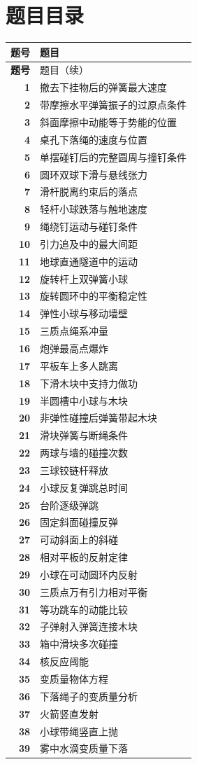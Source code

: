 \documentclass[UTF8,fontset=fandol,a4paper,11pt]{ctexart}
\begin{document}
\section*{题目目录}
\begin{longtable}{@{}>{\color{accent}\bfseries}r p{120mm}@{}}
\toprule 题号 & 题目\\\midrule
\endfirsthead
\toprule 题号 & 题目（续）\\\midrule
\endhead
1 & 撤去下挂物后的弹簧最大速度 \\
2 & 带摩擦水平弹簧振子的过原点条件 \\
3 & 斜面摩擦中动能等于势能的位置 \\
4 & 桌孔下落绳的速度与位置 \\
5 & 单摆碰钉后的完整圆周与撞钉条件 \\
6 & 圆环双球下滑与悬线张力 \\
7 & 滑杆脱离约束后的落点 \\
8 & 轻杆小球跌落与触地速度 \\
9 & 绳绕钉运动与碰钉条件 \\
10 & 引力追及中的最大间距 \\
11 & 地球直通隧道中的运动 \\
12 & 旋转杆上双弹簧小球 \\
13 & 旋转圆环中的平衡稳定性 \\
14 & 弹性小球与移动墙壁 \\
15 & 三质点绳系冲量 \\
16 & 炮弹最高点爆炸 \\
17 & 平板车上多人跳离 \\
18 & 下滑木块中支持力做功 \\
19 & 半圆槽中小球与木块 \\
20 & 非弹性碰撞后弹簧带起木块 \\
21 & 滑块弹簧与断绳条件 \\
22 & 两球与墙的碰撞次数 \\
23 & 三球铰链杆释放 \\
24 & 小球反复弹跳总时间 \\
25 & 台阶逐级弹跳 \\
26 & 固定斜面碰撞反弹 \\
27 & 可动斜面上的斜碰 \\
28 & 相对平板的反射定律 \\
29 & 小球在可动圆环内反射 \\
30 & 三质点万有引力相对平衡 \\
31 & 等功跳车的动能比较 \\
32 & 子弹射入弹簧连接木块 \\
33 & 箱中滑块多次碰撞 \\
34 & 核反应阈能 \\
35 & 变质量物体方程 \\
36 & 下落绳子的变质量分析 \\
37 & 火箭竖直发射 \\
38 & 小球带绳竖直上抛 \\
39 & 雾中水滴变质量下落 \\
\bottomrule\end{longtable}
\end{document}
